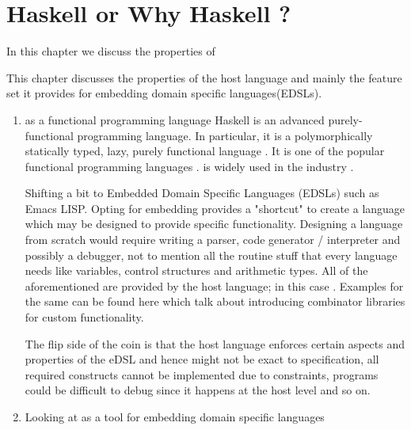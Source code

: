 \documentclass[proposal.tex]{subfiles}
\begin{document}
\chapter{Haskell or Why Haskell ?}\label{chap:hwh}

In this chapter we discuss the properties of  

\par This chapter discusses the properties of the host language  and mainly the feature set it provides for embedding 
domain specific languages(EDSLs).

\begin{enumerate}

\item {} as a functional programming language
Haskell is an advanced purely-functional programming language. In particular, it is a polymorphically statically typed, lazy, purely 
functional language \cite{website:haskellwiki}. It is one of the popular functional programming languages \cite{website:langpop}. 
 is widely used in the industry \cite{website:haskellinindustry}. 

Shifting a bit to Embedded Domain Specific Languages (EDSLs) such as Emacs LISP. Opting for embedding provides a "shortcut" to create a 
language which may be designed to provide specific functionality. Designing a language from scratch would require writing a parser, code 
generator / interpreter and possibly a debugger, not to mention all the routine stuff that every language needs like variables, control 
structures and arithmetic types. All of the aforementioned are provided by the host language; in this case . Examples for 
the same can be found here \cite{jones2001composing, meyer2008eiffel} which talk about introducing combinator libraries for custom 
functionality.

The flip side of the coin is that the host language enforces certain aspects and properties of the eDSL and hence might not be exact to 
specification, all required constructs cannot be implemented due to constraints, programs could be difficult to debug since it happens at
the host level and so on.

\item Looking at  as a tool for embedding domain specific languages\cite{website:paulspontifications}


\end{enumerate}
\end{document}
